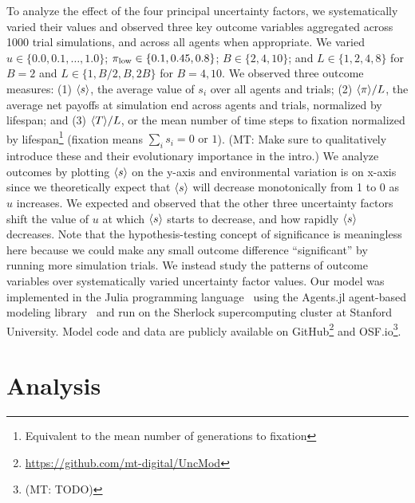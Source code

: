 \documentclass[letterpaper,11.5pt]{scrartcl}
\newcommand{\mt}[1]{{\textcolor{myorange} {({\tiny MT:} #1)}}}
\begin{document}
To analyze the effect of the four principal uncertainty factors, we systematically
varied their values and observed three key outcome variables aggregated across 1000
trial simulations, and across all agents when appropriate. We varied $u \in \{0.0,
0.1, \ldots, 1.0\}$; $\pi_{\mathrm{low}} \in \{0.1, 0.45, 0.8\}$; $B \in \{2, 4, 10\}$; and $L
\in \{1,2,4,8\}$ for $B=2$ and $L \in \{1,B/2,B,2B\}$ for $B=4,10$.  We observed
three outcome measures: (1) $\langle s \rangle$, the average value of $s_i$ over all agents
and trials; (2) $\langle \pi \rangle / L$, the average net payoffs at simulation end across
agents and trials, normalized by lifespan; and (3) $\langle T \rangle / L$, 
or the mean number of time steps to fixation normalized by
lifespan\footnote{Equivalent to the mean number of generations to fixation}
(fixation means $\sum_i s_i = 0 \text{ or } 1$). \mt{Make sure to qualitatively
introduce these and their evolutionary importance in the intro.}
We analyze outcomes by plotting $\langle s \rangle$ on the y-axis and environmental
variation is on x-axis since we theoretically expect that $\langle s \rangle$ will 
decrease monotonically from 1 to 0 as $u$ increases. We expected and observed
that the other three uncertainty factors shift the value of $u$ at which 
$\langle s \rangle$ starts to decrease, and how rapidly $\langle s \rangle$ decreases. Note that the
hypothesis-testing concept of significance is meaningless here because we could
make any small outcome difference ``significant'' by running more simulation trials.
We instead study the patterns of outcome 
variables over systematically varied uncertainty factor values. 
Our model was implemented in the Julia programming language~\cite{Bezanson2017} 
using the Agents.jl agent-based modeling library~\cite{Datseris2022} and run
on the Sherlock supercomputing cluster at Stanford University. Model code and
data are publicly available on GitHub\footnote{\url{https://github.com/mt-digital/UncMod}} 
and OSF.io\footnote{\mt{TODO}}.


\section{Analysis}
\end{document}
